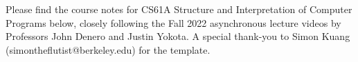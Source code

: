 \documentclass[10pt, article, oneside, margin=1in]{memoir}
\begin{document}
	\maketitle
	
	Please find the course notes for CS61A Structure and Interpretation of Computer Programs below, closely following the Fall 2022 asynchronous lecture videos by Professors John Denero and Justin Yokota. A special thank-you to Simon Kuang (simontheflutist@berkeley.edu) for the template.
	
	\tableofcontents*
	\newpage

	
	
	
	
	
	
	
	
	
	
	
	
	
	
	
	
	
	
	
	
	
	
	
	
	
	
\end{document}
